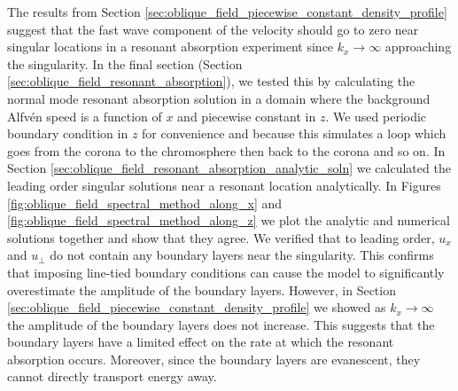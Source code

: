 The results from Section \ref{sec:oblique_field_piecewise_constant_density_profile} suggest that the fast wave component of the velocity should go to zero near singular locations in a resonant absorption experiment since $k_x\rightarrow \infty$ approaching the singularity. In the final section (Section \ref{sec:oblique_field_resonant_absorption}), we tested this by calculating the normal mode resonant absorption solution in a domain where the background Alfv\'en speed is a function of $x$ and piecewise constant in $z$. We used periodic boundary condition in $z$ for convenience and because this simulates a loop which goes from the corona to the chromosphere then back to the corona and so on. In Section \ref{sec:oblique_field_resonant_absorption_analytic_soln} we calculated the leading order singular solutions near a resonant location analytically. In Figures \ref{fig:oblique_field_spectral_method_along_x} and \ref{fig:oblique_field_spectral_method_along_z} we plot the analytic and numerical solutions together and show that they agree. We verified that to leading order, $u_x$ and $u_\perp$ do not contain any boundary layers near the singularity. This confirms that imposing line-tied boundary conditions can cause the model to significantly overestimate the amplitude of the boundary layers. However, in Section \ref{sec:oblique_field_piecewise_constant_density_profile} we showed as $k_x\rightarrow\infty$ the amplitude of the boundary layers does not increase. This suggests that the boundary layers have a limited effect on the rate at which the resonant absorption occurs. Moreover, since the boundary layers are evanescent, they cannot directly transport energy away.

